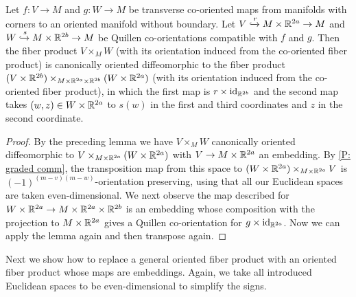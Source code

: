 \begin{corollary}\label{C: co-oriented full transition to embedded}
	Let $f \colon V \to M$ and $g \colon W \to M$ be transverse co-oriented maps from manifolds with corners to an oriented manifold without boundary.
	Let $V\xhookrightarrow{r} M \times \mathbb{R}^{2a} \to M$ and $W\xhookrightarrow{s} M \times \mathbb{R}^{2b} \to M$ be Quillen co-orientations compatible with $f$ and $g$.
	Then the fiber product $V \times_M W$ (with its orientation induced from the co-oriented fiber product) is canonically oriented diffeomorphic to the fiber product $(V \times \mathbb{R}^{2b})\times_{M \times \mathbb{R}^{2a} \times \mathbb{R}^{2b}}(W \times \mathbb{R}^{2a})$ (with its orientation induced from the co-oriented fiber product), in which the first map is $r \times \mathrm{id}_{\mathbb{R}^{2b}}$ and the second map takes $(w,z) \in W \times \mathbb{R}^{2a}$ to $s(w)$ in the first and third coordinates and $z$ in the second coordinate.
\end{corollary}

\begin{proof}
	By the preceding lemma we have $V \times_M W$ canonically oriented diffeomorphic to $V\times_{M \times \mathbb{R}^{2a}}(W \times \mathbb{R}^{2a})$ with $V \to M \times \mathbb{R}^{2a}$ an embedding.
	By \cref{P: graded comm}, the transposition map from this space to $(W \times \mathbb{R}^{2a})\times_{M \times \mathbb{R}^{2a}}V$ is $(-1)^{(m-v)(m-w)}$-orientation preserving, using that all our Euclidean spaces are taken even-dimensional.
	We next observe the map described for $W \times \mathbb{R}^{2a} \to M \times \mathbb{R}^{2a} \times \mathbb{R}^{2b}$ is an embedding whose composition with the projection to $M \times \mathbb{R}^{2a}$ gives a Quillen co-orientation for $g \times \mathrm{id}_{\mathbb{R}^{2a}}$.
	Now we can apply the lemma again and then transpose again.
\end{proof}

Next we show how to replace a general oriented fiber product with an oriented fiber product whose maps are embeddings.
Again, we take all introduced Euclidean spaces to be even-dimensional to simplify the signs.

